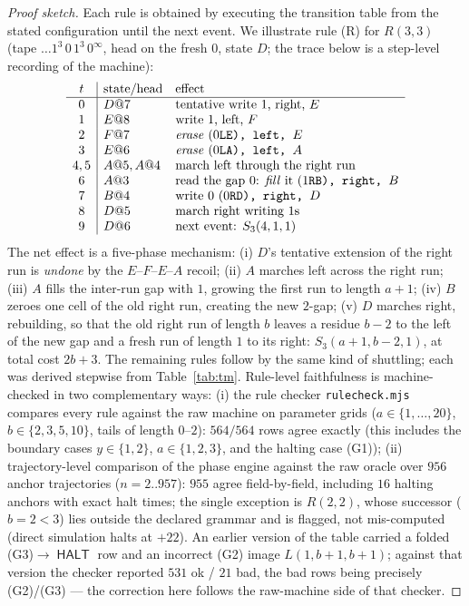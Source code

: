 \documentclass[11pt]{amsart}
\theoremstyle{definition}
\DeclareMathOperator{\HALT}{\textsf{HALT}}
\begin{document}
\begin{proof}[Proof sketch]
Each rule is obtained by executing the transition table from the stated
configuration until the next event. We illustrate rule (R) for $R(3,3)$
(tape $\dots1^3\,0\,1^3\,0^\infty$, head on the fresh $0$, state $D$;
the trace below is a step-level recording of the machine):
\[
\begin{array}{c|ll}
t & \text{state/head} & \text{effect}\\\hline
0 & D@7 & \text{tentative write }1\text{, right, }E\\
1 & E@8 & \text{write }1\text{, left, }F\\
2 & F@7 & \text{\emph{erase} (}0\texttt{LE), left, }E\\
3 & E@6 & \text{\emph{erase} (}0\texttt{LA), left, }A\\
4,5 & A@5,A@4 & \text{march left through the right run}\\
6 & A@3 & \text{read the gap }0\text{: \emph{fill} it (}1\texttt{RB), right, }B\\
7 & B@4 & \text{write }0\text{ (}0\texttt{RD), right, }D\\
8 & D@5 & \text{march right writing }1\text{s}\\
9 & D@6 & \text{next event: }S_3(4,1,1)
\end{array}
\]
The net effect is a five-phase mechanism: (i) $D$'s tentative extension of
the right run is \emph{undone} by the $E$--$F$--$E$--$A$ recoil; (ii) $A$
marches left across the right run; (iii) $A$ fills the inter-run gap with
$1$, growing the first run to length $a{+}1$; (iv) $B$ zeroes one cell of
the old right run, creating the new $2$-gap; (v) $D$ marches right,
rebuilding, so that the old right run of length $b$ leaves a residue $b-2$
to the left of the new gap and a fresh run of length $1$ to its right:
$S_3(a+1,b-2,1)$, at total cost $2b+3$. The remaining rules follow
by the same kind of shuttling; each was derived stepwise from
Table~\ref{tab:tm}. Rule-level faithfulness is machine-checked in two
complementary ways: (i) the rule checker \texttt{rulecheck.mjs} compares
every rule against the raw machine on parameter grids ($a\in\{1,\dots,20\}$,
$b\in\{2,3,5,10\}$, tails of length $0$--$2$): $564/564$ rows agree exactly
(this includes the boundary cases $y\in\{1,2\}$, $a\in\{1,2,3\}$, and the
halting case (G1)); (ii) trajectory-level comparison of the phase engine
against the raw oracle over $956$ anchor trajectories ($n=2..957$):
$955$ agree field-by-field, including $16$ halting anchors with exact halt
times; the single exception is $R(2,2)$, whose successor ($b=2<3$) lies
outside the declared grammar and is flagged, not mis-computed (direct
simulation halts at $+22$). An earlier version of the table carried a
folded (G3)$\to\HALT$ row and an incorrect (G2) image
$L(1,b{+}1,b{+}1)$; against that version the checker reported
$531$ ok / $21$ bad, the bad rows being precisely (G2)/(G3) --- the
correction here follows the raw-machine side of that checker.
\end{proof}
\end{document}
